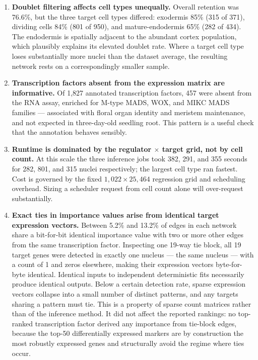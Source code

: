 \documentclass[11pt,a4paper]{article}
\begin{document}
\begin{enumerate}[leftmargin=*]

\item \textbf{Doublet filtering affects cell types unequally.} Overall retention was 76.6\%, but the three target cell types differed: exodermis 85\% (315 of 371), dividing cells 84\% (801 of 950), and mature-endodermis 65\% (282 of 434). The endodermis is spatially adjacent to the abundant cortex population, which plausibly explains its elevated doublet rate. Where a target cell type loses substantially more nuclei than the dataset average, the resulting network rests on a correspondingly smaller sample.

\item \textbf{Transcription factors absent from the expression matrix are informative.} Of 1,827 annotated transcription factors, 457 were absent from the RNA assay, enriched for M-type MADS, WOX, and MIKC MADS families --- associated with floral organ identity and meristem maintenance, and not expected in three-day-old seedling root. This pattern is a useful check that the annotation behaves sensibly.

\item \textbf{Runtime is dominated by the regulator $\times$ target grid, not by cell count.} At this scale the three inference jobs took 382, 291, and 355 seconds for 282, 801, and 315 nuclei respectively; the largest cell type ran fastest. Cost is governed by the fixed $1{,}022 \times 25{,}464$ regression grid and scheduling overhead. Sizing a scheduler request from cell count alone will over-request substantially.

\item \textbf{Exact ties in importance values arise from identical target expression vectors.} Between 5.2\% and 13.2\% of edges in each network share a bit-for-bit identical importance value with two or more other edges from the same transcription factor. Inspecting one 19-way tie block, all 19 target genes were detected in exactly one nucleus --- the same nucleus --- with a count of 1 and zeros elsewhere, making their expression vectors byte-for-byte identical. Identical inputs to independent deterministic fits necessarily produce identical outputs. Below a certain detection rate, sparse expression vectors collapse into a small number of distinct patterns, and any targets sharing a pattern must tie. This is a property of sparse count matrices rather than of the inference method. It did not affect the reported rankings: no top-ranked transcription factor derived any importance from tie-block edges, because the top-50 differentially expressed markers are by construction the most robustly expressed genes and structurally avoid the regime where ties occur.


\end{enumerate}
\end{document}
